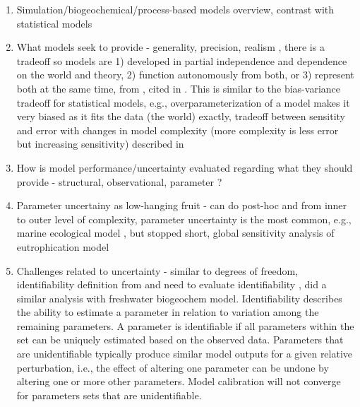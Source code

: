 \documentclass[letterpaper,12pt,oneside]{article}\usepackage[]{graphicx}\usepackage[]{color}
\begin{document}
\begin{enumerate}
\item Simulation/biogeochemical/process-based models overview, contrast with statistical models
\item What models seek to provide - generality, precision, realism \cite{Levins66}, there is a tradeoff so models are 1) developed in partial independence and dependence on the world and theory, 2) function autonomously from both, or 3) represent both at the same time, from \cite{Morrison99}, cited in \cite{Ganju16}.  This is similar to the bias-variance tradeoff for statistical models, e.g., overparameterization of a model makes it very biased as it fits the data (the world) exactly, tradeoff between sensitity and error with changes in model complexity (more complexity is less error but increasing sensitivity) described in \cite{Snowling01}
\item How is model performance/uncertainty evaluated regarding what they should provide - structural, observational, parameter \cite{Beck87}?
\item Parameter uncertainy as low-hanging fruit - can do post-hoc and from inner to outer level of complexity, parameter uncertainty is the most common, e.g., marine ecological model \cite{Mateus15}, but stopped short, global sensitivity analysis of eutrophication model \cite{Estrada10}
\item Challenges related to uncertainty - similar to degrees of freedom, identifiability definition from \cite{Brun01} and need to evaluate identifiability \cite{Fasham06}, \cite{Omlin01} did a similar analysis with freshwater biogeochem model.
Identifiability describes the ability to estimate a parameter in relation to variation among the remaining parameters.  A parameter is identifiable if all parameters within the set can be uniquely estimated based on the observed data.  Parameters that are unidentifiable typically produce similar model outputs for a given relative perturbation, i.e., the effect of altering one parameter can be undone by altering one or more other parameters.  Model calibration will not converge for parameters sets that are unidentifiable. 
\end{enumerate}
\end{document}
